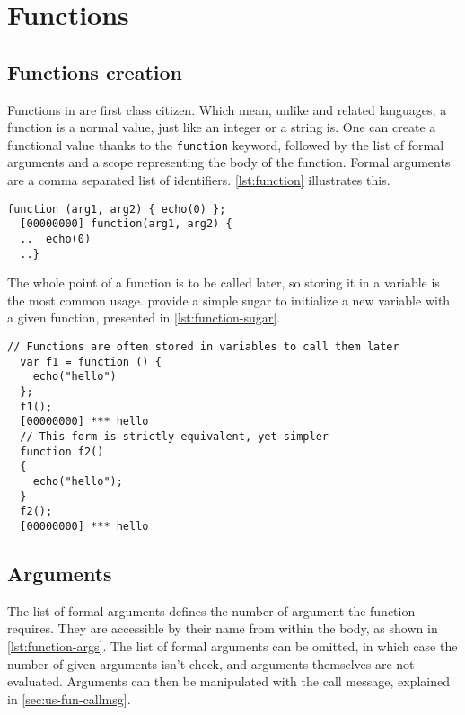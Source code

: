 \documentclass[openright,twoside,12pt]{report}
\begin{document}
\FloatBarrier
\section{Functions}

\subsection{Functions creation}

Functions in \us are first class citizen. Which mean, unlike \C and
related languages, a function is a normal value, just like an integer
or a string is. One can create a functional value thanks to the
\lstinline|function| keyword, followed by the list of formal arguments
and a scope representing the body of the function. Formal arguments
are a comma separated list of identifiers. \autoref{lst:function} illustrates
this.

\begin{lstlisting}[caption=Functional
  value,label=lst:function,float=\floatpos]
  function (arg1, arg2) { echo(0) };
  [00000000] function(arg1, arg2) {
  ..  echo(0)
  ..}
\end{lstlisting}

The whole point of a function is to be called later, so storing it in
a variable is the most common usage. \us provide a simple sugar to
initialize a new variable with a given function, presented in
\autoref{lst:function-sugar}.

\begin{lstlisting}[caption=Storing functions in variables,
  label=lst:function-sugar,float=\floatpos]
  // Functions are often stored in variables to call them later
  var f1 = function () {
    echo("hello")
  };
  f1();
  [00000000] *** hello
  // This form is strictly equivalent, yet simpler
  function f2()
  {
    echo("hello");
  }
  f2();
  [00000000] *** hello
\end{lstlisting}

\subsection{Arguments}

The list of formal arguments defines the number of argument the
function requires. They are accessible by their name from within the
body, as shown in \autoref{lst:function-args}. The list of formal arguments
can be omitted, in which case the number of given arguments isn't
check, and arguments themselves are not evaluated. Arguments can then
be manipulated with the call message, explained in
\autoref{sec:us-fun-callmsg}.
\end{document}
